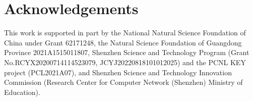\section{Acknowledgements}
This work is supported in part by the National Natural Science Foundation of China under Grant 62171248, the Natural Science Foundation of Guangdong Province 2021A1515011807, Shenzhen Science and Technology Program (Grant No.RCYX20200714114523079, JCYJ20220818101012025) and the PCNL KEY project (PCL2021A07), and Shenzhen Science and Technology Innovation Commission (Research Center for Computer Network (Shenzhen) Ministry of Education).